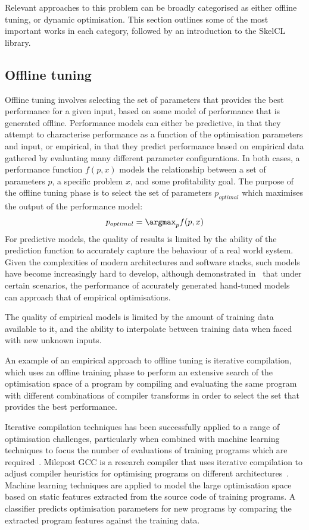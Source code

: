 Relevant approaches to this problem can be broadly categorised as
either offline tuning, or dynamic optimisation. This section outlines
some of the most important works in each category, followed by an
introduction to the SkelCL library.

\subsection{Offline tuning}\label{subsec:offline-tuning}
Offline tuning involves selecting the set of parameters that provides
the best performance for a given input, based on some model of
performance that is generated offline. Performance models can either
be predictive, in that they attempt to characterise performance as a
function of the optimisation parameters and input, or empirical, in
that they predict performance based on empirical data gathered by
evaluating many different parameter configurations. In both cases, a
performance function $f(p,x)$ models the relationship between a set of
parameters $p$, a specific problem $x$, and some profitability
goal. The purpose of the offline tuning phase is to select the set of
parameters $p_{optimal}$ which maximises the output of the performance
model:
\begin{align*}
  p_{optimal} = \argmax_{p}f(p,x)
\end{align*}
For predictive models, the quality of results is limited by the
ability of the prediction function to accurately capture the behaviour
of a real world system. Given the complexities of modern architectures
and software stacks, such models have become increasingly hard to
develop, although \citeauthor{Yotov2003} demonstrated
in~\cite{Yotov2003} that under certain scenarios, the performance of
accurately generated hand-tuned models can approach that of empirical
optimisations.

The quality of empirical models is limited by the amount of training
data available to it, and the ability to interpolate between training
data when faced with new unknown inputs.

An example of an empirical approach to offline tuning is iterative
compilation, which uses an offline training phase to perform an
extensive search of the optimisation space of a program by compiling
and evaluating the same program with different combinations of
compiler transforms in order to select the set that provides the best
performance.

Iterative compilation techniques has been successfully applied to a
range of optimisation challenges, particularly when combined with
machine learning techniques to focus the number of evaluations of
training programs which are required~\cite{Agakov}. Milepost GCC is a
research compiler that uses iterative compilation to adjust compiler
heuristics for optimising programs on different
architectures~\cite{Fursin2011}. Machine learning techniques are
applied to model the large optimisation space based on static features
extracted from the source code of training programs. A classifier
predicts optimisation parameters for new programs by comparing the
extracted program features against the training data.


